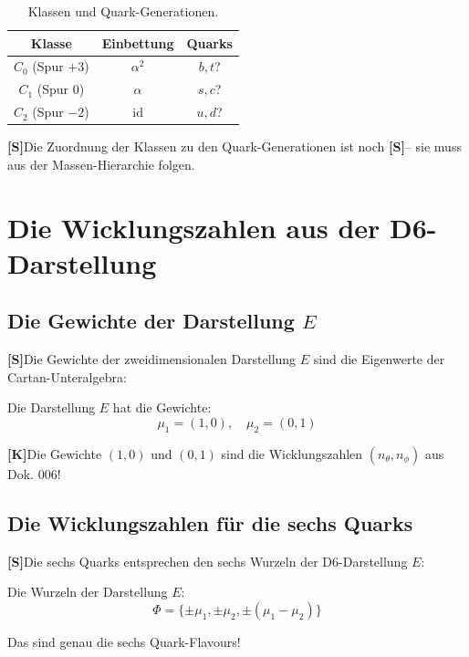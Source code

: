 \documentclass[11pt,a4paper]{article}
\newcommand{\Kstatus}{\textbf{[K]}}
\newcommand{\Sstatus}{\textbf{[S]}}
\begin{document}
	\begin{table}[h!]
		\centering
		\caption{Klassen und Quark-Generationen.}
		\label{tab:classes_generations}
		\begin{tabular}{c c c}
			\toprule
			\textbf{Klasse} & \textbf{Einbettung} & \textbf{Quarks} \\
			\midrule
			$C_0$ (Spur $+3$) & $\alpha^2$ & $b, t$? \\
			$C_1$ (Spur $0$) & $\alpha$ & $s, c$? \\
			$C_2$ (Spur $-2$) & id & $u, d$? \\
			\bottomrule
		\end{tabular}
	\end{table}
	
	\Sstatus Die Zuordnung der Klassen zu den Quark-Generationen ist noch \Sstatus -- sie muss aus der Massen-Hierarchie folgen.
	
	\section{Die Wicklungszahlen aus der D6-Darstellung}
	
	\subsection{Die Gewichte der Darstellung $E$}
	
	\Sstatus Die Gewichte der zweidimensionalen Darstellung $E$ sind die Eigenwerte der Cartan-Unteralgebra:
	
	Die Darstellung $E$ hat die Gewichte:
	\begin{equation}
		\mu_1 = (1, 0), \quad \mu_2 = (0, 1)
	\end{equation}
	
	\Kstatus Die Gewichte $(1, 0)$ und $(0, 1)$ sind die Wicklungszahlen $(n_\theta, n_\phi)$ aus Dok. 006!
	
	\subsection{Die Wicklungszahlen für die sechs Quarks}
	
	\Sstatus Die sechs Quarks entsprechen den sechs Wurzeln der D6-Darstellung $E$:
	
	Die Wurzeln der Darstellung $E$:
	\begin{equation}
		\Phi = \{\pm \mu_1, \pm \mu_2, \pm (\mu_1 - \mu_2)\}
	\end{equation}
	
	Das sind genau die sechs Quark-Flavours!
	
\end{document}

